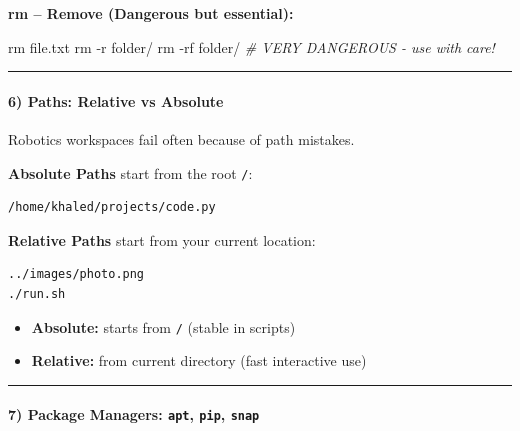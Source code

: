 \documentclass[
  english,
  paper=a4,
  oneside  ,captions=tableheading
]{scrartcl}
\newenvironment{Shaded}{}{}
\newcommand{\AttributeTok}[1]{\textcolor[rgb]{0.49,0.56,0.16}{#1}}
\newcommand{\CommentTok}[1]{\textcolor[rgb]{0.38,0.63,0.69}{\textit{#1}}}
\newcommand{\FunctionTok}[1]{\textcolor[rgb]{0.02,0.16,0.49}{#1}}
\newcommand{\NormalTok}[1]{#1}
\providecommand{\tightlist}{%
  \setlength{\itemsep}{0pt}\setlength{\parskip}{0pt}}
\begin{document}
\textbf{rm -- Remove (\faExclamationCircle Dangerous but essential):}

\begin{Shaded}
\begin{Highlighting}[]
\FunctionTok{rm}\NormalTok{ file.txt}
\FunctionTok{rm} \AttributeTok{{-}r}\NormalTok{ folder/}
\FunctionTok{rm} \AttributeTok{{-}rf}\NormalTok{ folder/    }\CommentTok{\# VERY DANGEROUS {-} use with care!}
\end{Highlighting}
\end{Shaded}

\begin{center}\rule{0.5\linewidth}{0.5pt}\end{center}

\paragraph{6) Paths: Relative vs
Absolute}\label{paths-relative-vs-absolute}

Robotics workspaces fail often because of path mistakes.

\textbf{Absolute Paths} start from the root \texttt{/}:

\begin{verbatim}
/home/khaled/projects/code.py
\end{verbatim}

\textbf{Relative Paths} start from your current location:

\begin{verbatim}
../images/photo.png
./run.sh
\end{verbatim}

\begin{itemize}
\tightlist
\item
  \textbf{Absolute:} starts from \texttt{/} (stable in scripts)
\item
  \textbf{Relative:} from current directory (fast interactive use)
\end{itemize}

\begin{center}\rule{0.5\linewidth}{0.5pt}\end{center}

\paragraph{\texorpdfstring{7) Package Managers: \texttt{apt},
\texttt{pip},
\texttt{snap}}{7) Package Managers: apt, pip, snap}}\label{package-managers-apt-pip-snap}
\end{document}
